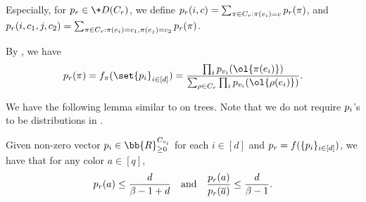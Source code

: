 \documentclass[a4paper,11pt]{article}
\begin{document}
Especially, for $\*p_r \in \+D(C_r)$, we define $\*p_r(i,c)=\sum_{\pi \in C_r: \pi(e_i)=c} \*p_r(\pi)$, and $\*p_r(i,c_1,j,c_2)=\sum_{\pi \in C_r: \pi(e_i)=c_1, \pi(e_j)=c_2} \*p_r(\pi)$.

By , we have
\begin{equation}\label{eq:tree-recursion-short}
    \*p_r(\pi)=f_\pi(\set{\*{p}_i}_{i\in [d]})=
    \frac{\prod_i \*p_{v_i}(\ol{\pi(e_i)})}
    {\sum_{\rho \in C_r} \prod_i \*p_{v_i}(\ol{\rho(e_i)})}.
\end{equation}

We have the following lemma similar to 
on trees. Note that we do not require $\*p_i$'s to be distributions in .
\begin{lemma}\label{lem:marginal_bound_1}
     Given non-zero vector $\*p_i\in \bb{R}_{\geq 0}^{C_{v_i}}$ for each $i\in [d]$ and $\*p_r = f(\{\*p_i\}_{i\in[d]})$, we have that for any color $a \in [q]$,
    \[
        \*p_r(a) \leq \frac{d}{\beta - 1 + d} \quad\mbox{and}\quad  \frac{\*p_r(a)}{\*p_r(\overline{a})} \leq \frac{d}{\beta - 1}.
    \]
    \end{lemma}
\end{document}
